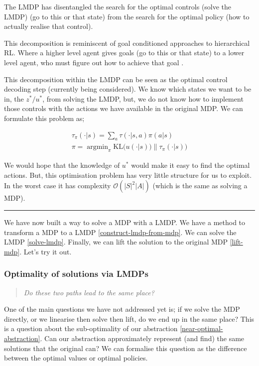 The LMDP has disentangled the search for the optimal controls (solve the LMDP) (go to this or
that state) from the search for the optimal policy (how to actually
realise that control).

This decomposition is reminiscent of goal conditioned approaches to hierarchical RL.
Where a higher level agent gives goals (go to this or that state) to a lower level
agent, who must figure out how to achieve that goal \cite{Vezhnevets2017}.

This decomposition within the LMDP can be seen as the optimal control decoding
step (currently being considered). We know which
states we want to be in, the $z^{* } / u^{* }$, from solving the LMDP, but,
we do not know how to implement those controls with the actions we have available in the original MDP.
We can formulate this problem as;

\begin{align*}
\tau_{\pi}(\cdot | s) = \sum_a \tau(\cdot | s, a) \pi(a | s) \\
\pi = \mathop{\text{argmin}}_{\pi} \text{KL}\Big(u(\cdot | s))\parallel \tau_{\pi}(\cdot | s)\Big)
\end{align*}

We would hope that the knowledge of $u^{* }$ would make it easy to find the optimal actions.
But, this optimisation problem has very little structure for us to exploit.
In the worst case it has complexity $\mathcal O(|S|^2|A|)$ (which is the same as solving a MDP).

\begin{center}\rule{0.5\linewidth}{\linethickness}\end{center}

We have now built a way to solve a MDP with a LMDP.
We have a method to transform a MDP to a LMDP \ref{construct-lmdp-from-mdp}.
We can solve the LMDP \ref{solve-lmdp}.
Finally, we can lift the solution to the original MDP \ref{lift-mdp}.
Let's try it out.

\subsubsection{Optimality of solutions via LMDPs}\label{paths}

\begin{quote}
\textsl{Do these two paths lead to the same place?}
\end{quote}

One of the main questions we have not addressed yet is; if we solve the
MDP directly, or we linearise then solve then lift, do we end up in the same
place? This is a question about the sub-optimality of our abstraction \ref{near-optimal-abstraction}. Can
our abstraction approximately represent (and find) the same solutions that the
original can? We can formalise this question as the difference between the optimal values or optimal policies.

